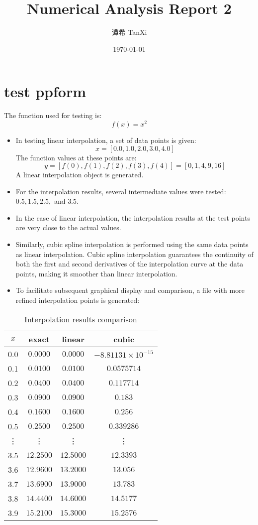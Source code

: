\documentclass[a4paper]{article}
\title{Numerical Analysis Report 2}
\author[1]{谭希 TanXi}
\affil[1]{Zhejiang University, Email: \texttt{3220100027@zju.edu.cn}}
\date{\today}
\begin{document}
\maketitle

\section*{test ppform}
The function used for testing is:
\[
f(x) = x^2
\]

\begin{itemize}
    \item In testing linear interpolation, a set of data points is given:
    \[
    x = [0.0, 1.0, 2.0, 3.0, 4.0]
    \]
    The function values at these points are:
    \[
    y = [f(0), f(1), f(2), f(3), f(4)] = [0, 1, 4, 9, 16]
    \]
    A linear interpolation object is generated.
    
    \item For the interpolation results, several intermediate values were tested: \( 0.5, 1.5, 2.5, \) and \( 3.5 \).
    
    \item In the case of linear interpolation, the interpolation results at the test points are very close to the actual values.
    
    \item Similarly, cubic spline interpolation is performed using the same data points as linear interpolation. Cubic spline interpolation guarantees the continuity of both the first and second derivatives of the interpolation curve at the data points, making it smoother than linear interpolation.
    
    \item To facilitate subsequent graphical display and comparison, a file with more refined interpolation points is generated:
\end{itemize}

\begin{table}[h!]
\centering
\begin{tabular}{|c|c|c|c|}
\hline
$x$ & exact & linear & cubic \\
\hline
0.0 & $0.0000$ & $0.0000$ & $-8.81131 \times 10^{-15}$ \\
0.1 & $0.0100$ & $0.0100$ & $0.0575714$ \\
0.2 & $0.0400$ & $0.0400$ & $0.117714$ \\
0.3 & $0.0900$ & $0.0900$ & $0.183$ \\
0.4 & $0.1600$ & $0.1600$ & $0.256$ \\
0.5 & $0.2500$ & $0.2500$ & $0.339286$ \\
\vdots & \vdots & \vdots & \vdots \\
3.5 & $12.2500$ & $12.5000$ & $12.3393$ \\
3.6 & $12.9600$ & $13.2000$ & $13.056$ \\
3.7 & $13.6900$ & $13.9000$ & $13.783$ \\
3.8 & $14.4400$ & $14.6000$ & $14.5177$ \\
3.9 & $15.2100$ & $15.3000$ & $15.2576$ \\
\hline
\end{tabular}
\caption{Interpolation results comparison}
\end{table}
\end{document}
